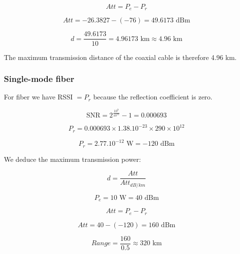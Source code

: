 \documentclass[12]{article}
\begin{document}
\begin{equation*}
    Att = P_e - P_r
\end{equation*}

\begin{equation*}
    Att = -26.3827 - \left( -76 \right) = 49.6173 \text{ dBm}
\end{equation*}

\begin{equation*}
    d = \frac{49.6173}{10} = 4.96173 \text{ km} \approx 4.96 \text{ km}
\end{equation*}

The maximum transmission distance of the coaxial cable is therefore 4.96 km.


\subsubsection{Single-mode fiber}

For fiber we have RSSI $= P_r$ because the reflection coefficient is zero.


\begin{equation*}
    \text{SNR} = 2^{ \frac{10^9}{10^{12}}} -1 = 0.000693
\end{equation*}

\begin{equation*}
    P_r = 0.000693 \times 1.38.10^{-23} \times 290 \times 10^{12}
\end{equation*}

\begin{equation*}
    P_r = 2.77.10^{-12} \text{ W} = -120 \text{ dBm}
\end{equation*}

We deduce the maximum transmission power:

\begin{equation*}
    d = \frac{Att}{Att_{dB/km}}
\end{equation*}

\begin{equation*}
    P_e = 10 \text{ W} = 40 \text{ dBm}
\end{equation*}

\begin{equation*}
    Att = P_e - P_r
\end{equation*}

\begin{equation*}
    Att = 40 - \left( -120 \right) = 160 \text{ dBm}
\end{equation*}

\begin{equation*}
    Range = \frac{160}{0.5} \approx 320 \text{ km}
\end{equation*}
\end{document}
